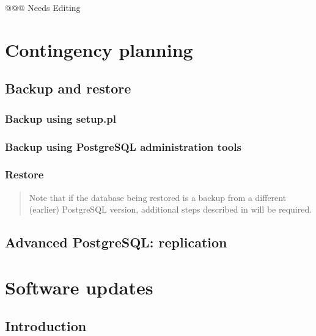 @@@ Needs Editing

\chapter{Contingency planning}
\label{cha-contingency}

\section{Backup and restore}
\label{sec-contingency-backup-restore}

\subsection{Backup using setup.pl}
\label{subsec-contingency-backup-setup-pl}


\subsection{Backup using PostgreSQL administration tools}
\label{subsec-contingency-backup-psql}

\subsection{Restore}
\label{subsec-contingency-restore}

\begin{quote}
Note that if the database being restored is a backup from a different (earlier) PostgreSQL version,
additional steps described in  will be required.
\end{quote}




\section{Advanced PostgreSQL: replication}
\label{sec-contingency-replication}


\chapter{Software updates}
\label{cha-software-updates}

\section{Introduction}
\label{sec-updates-introduction}

